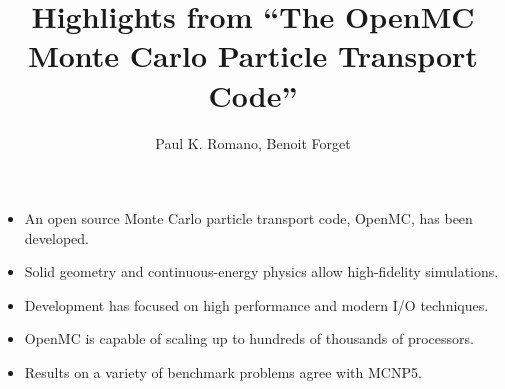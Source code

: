 \documentclass{article}
\begin{document}
\title{Highlights from ``The OpenMC Monte Carlo Particle Transport Code''}
\author{Paul K. Romano, Benoit Forget}
\maketitle

\begin{itemize}
\item An open source Monte Carlo particle transport code, OpenMC, has been developed.
\item Solid geometry and continuous-energy physics allow high-fidelity simulations.
\item Development has focused on high performance and modern I/O techniques.
\item OpenMC is capable of scaling up to hundreds of thousands of processors.
\item Results on a variety of benchmark problems agree with MCNP5.
\end{itemize}
\end{document}
